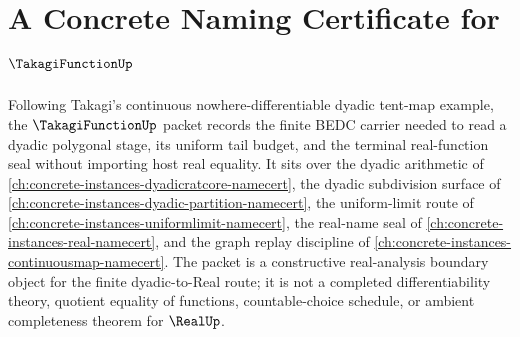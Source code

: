 \chapter{A Concrete Naming Certificate for $\TakagiFunctionUp$}
\label{ch:concrete-instances-takagi-function-namecert}

Following Takagi's continuous nowhere-differentiable dyadic tent-map example, the $\TakagiFunctionUp$ packet records the finite BEDC carrier needed to read a dyadic polygonal stage, its uniform tail budget, and the terminal real-function seal without importing host real equality. It sits over the dyadic arithmetic of \autoref{ch:concrete-instances-dyadicratcore-namecert}, the dyadic subdivision surface of \autoref{ch:concrete-instances-dyadic-partition-namecert}, the uniform-limit route of \autoref{ch:concrete-instances-uniformlimit-namecert}, the real-name seal of \autoref{ch:concrete-instances-real-namecert}, and the graph replay discipline of \autoref{ch:concrete-instances-continuousmap-namecert}. The packet is a constructive real-analysis boundary object for the finite dyadic-to-Real route; it is not a completed differentiability theory, quotient equality of functions, countable-choice schedule, or ambient completeness theorem for $\RealUp$.

